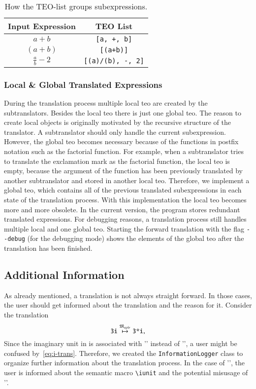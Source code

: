 \begin{table}[ht]
\centering
\begin{tabular}{cc}
	\hline
	Input Expression & TEO List\\
	\hline
	$a+b$ & \verb|[a, +, b]|\\
	$(a+b)$ & \verb|[(a+b)]|\\
	$\frac{a}{b}-2$ & \verb|[(a)/(b), -, 2]|\\
	\hline
\end{tabular}
\caption{How the TEO-list groups subexpressions.}
\label{tab:teo-list}
\end{table}

\subsubsection{Local \& Global Translated Expressions}
During the translation process multiple local \gls{teo} are created by the subtranslators. Besides the local \gls{teo} there is just one global \gls{teo}. The reason to create local objects is originally motivated by the recursive structure of the translator. A subtranslator should only handle the current subexpression. However, the global \gls{teo} becomes necessary because of the functions in postfix notation such as the factorial function. For example, when a subtranslator tries to translate the exclamation mark as the factorial function, the local \gls{teo} is empty, because the argument of the function has been previously translated by another subtranslator and stored in another local \gls{teo}. Therefore, we implement a global \gls{teo}, which contains all of the previous translated subexpressions in each state of the translation process. With this implementation the local \gls{teo} becomes more and more obsolete. In the current version, the program stores redundant translated expressions. For debugging reasons, a translation process still handles multiple local and one global \gls{teo}. Starting the forward translation with the flag \verb|--debug| (for the debugging mode) shows the elements of the global \gls{teo} after the translation has been finished.

\subsection{Additional Information}\label{subsec:add-info}
As already mentioned, a translation is not always straight forward. In those cases, the user should get informed about the translation and the reason for it. Consider the translation
\begin{equation}\label{eq:i-trans}
\verb|3i| \overset{\langMaple}{\mapsto} \verb|3*i|,
\end{equation}
Since the imaginary unit in \Maple{} is associated with '' instead of '', a user might be confused by~\ref{eq:i-trans}. Therefore, we created the \texttt{InformationLogger} class to organize further information about the translation process. In the case of '', the user is informed about the semantic macro \verb|\iunit| and the potential misusage of ''.

